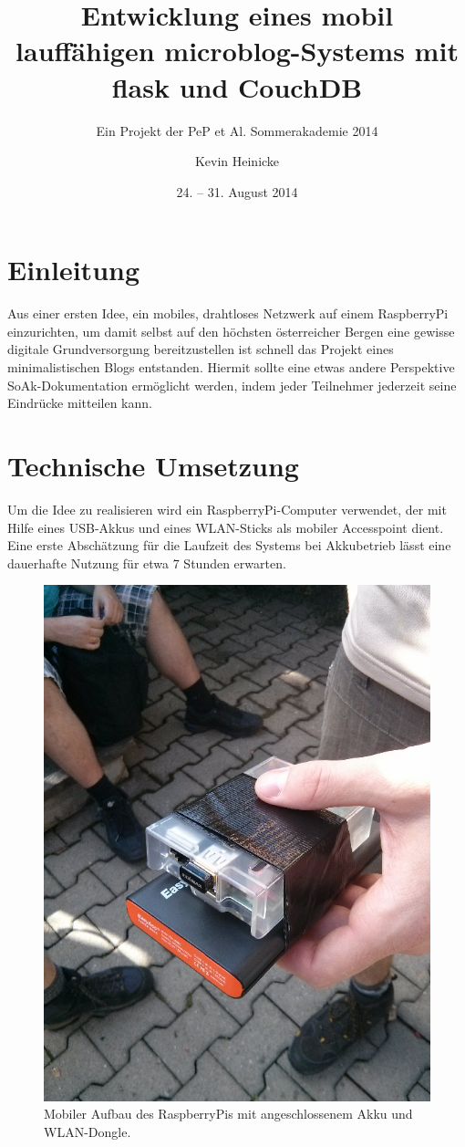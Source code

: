 

\title{Entwicklung eines mobil lauffähigen microblog-Systems mit flask und
CouchDB}
\subtitle{Ein Projekt der PeP et Al. Sommerakademie 2014}
\date{24. -- 31. August 2014}

\author{
    Kevin Heinicke
}



\maketitle
\tableofcontents

\section{Einleitung}
Aus einer ersten Idee, ein mobiles, drahtloses Netzwerk auf einem RaspberryPi
einzurichten, um damit selbst auf den höchsten österreicher Bergen eine
gewisse digitale Grundversorgung bereitzustellen ist schnell das Projekt
eines minimalistischen Blogs entstanden.
Hiermit sollte eine etwas andere Perspektive SoAk-Dokumentation ermöglicht
werden, indem jeder Teilnehmer jederzeit seine Eindrücke mitteilen kann.

\section{Technische Umsetzung}
Um die Idee zu realisieren wird ein RaspberryPi-Computer verwendet, der mit
Hilfe eines USB-Akkus und eines WLAN-Sticks als mobiler Accesspoint dient.
Eine erste Abschätzung für die Laufzeit des Systems bei Akkubetrieb lässt
eine dauerhafte Nutzung für etwa 7 Stunden erwarten.
\begin{figure}
  \centering
  \includegraphics[width=0.5\linewidth]{images/raspi1.jpg}
  \caption{Mobiler Aufbau des RaspberryPis mit angeschlossenem Akku
  und WLAN-Dongle.}
  \label{fig:raspi}
\end{figure}

